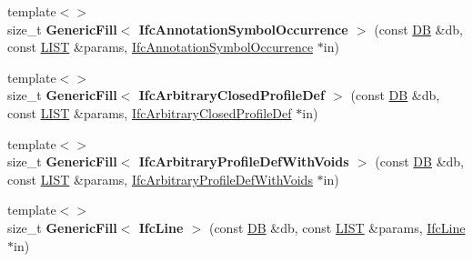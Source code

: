 \begin{DoxyCompactItemize}
\item 
\hypertarget{namespace_assimp_1_1_s_t_e_p_a406a22b40d4757a3fcf12a525b125973}{{\footnotesize template$<$$>$ }\\size\+\_\+t {\bfseries Generic\+Fill$<$ Ifc\+Annotation\+Symbol\+Occurrence $>$} (const \hyperlink{class_assimp_1_1_s_t_e_p_1_1_d_b}{D\+B} \&db, const \hyperlink{class_assimp_1_1_s_t_e_p_1_1_e_x_p_r_e_s_s_1_1_l_i_s_t}{L\+I\+S\+T} \&params, \hyperlink{struct_assimp_1_1_i_f_c_1_1_ifc_annotation_symbol_occurrence}{Ifc\+Annotation\+Symbol\+Occurrence} $\ast$in)}\label{namespace_assimp_1_1_s_t_e_p_a406a22b40d4757a3fcf12a525b125973}

\item 
\hypertarget{namespace_assimp_1_1_s_t_e_p_a25cc071d60e96c7112afe7ef971b5c62}{{\footnotesize template$<$$>$ }\\size\+\_\+t {\bfseries Generic\+Fill$<$ Ifc\+Arbitrary\+Closed\+Profile\+Def $>$} (const \hyperlink{class_assimp_1_1_s_t_e_p_1_1_d_b}{D\+B} \&db, const \hyperlink{class_assimp_1_1_s_t_e_p_1_1_e_x_p_r_e_s_s_1_1_l_i_s_t}{L\+I\+S\+T} \&params, \hyperlink{struct_assimp_1_1_i_f_c_1_1_ifc_arbitrary_closed_profile_def}{Ifc\+Arbitrary\+Closed\+Profile\+Def} $\ast$in)}\label{namespace_assimp_1_1_s_t_e_p_a25cc071d60e96c7112afe7ef971b5c62}

\item 
\hypertarget{namespace_assimp_1_1_s_t_e_p_a9e9f47e42575ec24b9fdff0db01e22f9}{{\footnotesize template$<$$>$ }\\size\+\_\+t {\bfseries Generic\+Fill$<$ Ifc\+Arbitrary\+Profile\+Def\+With\+Voids $>$} (const \hyperlink{class_assimp_1_1_s_t_e_p_1_1_d_b}{D\+B} \&db, const \hyperlink{class_assimp_1_1_s_t_e_p_1_1_e_x_p_r_e_s_s_1_1_l_i_s_t}{L\+I\+S\+T} \&params, \hyperlink{struct_assimp_1_1_i_f_c_1_1_ifc_arbitrary_profile_def_with_voids}{Ifc\+Arbitrary\+Profile\+Def\+With\+Voids} $\ast$in)}\label{namespace_assimp_1_1_s_t_e_p_a9e9f47e42575ec24b9fdff0db01e22f9}

\item 
\hypertarget{namespace_assimp_1_1_s_t_e_p_a23bf47f59ef63290e1d946ccc82d6fd7}{{\footnotesize template$<$$>$ }\\size\+\_\+t {\bfseries Generic\+Fill$<$ Ifc\+Line $>$} (const \hyperlink{class_assimp_1_1_s_t_e_p_1_1_d_b}{D\+B} \&db, const \hyperlink{class_assimp_1_1_s_t_e_p_1_1_e_x_p_r_e_s_s_1_1_l_i_s_t}{L\+I\+S\+T} \&params, \hyperlink{struct_assimp_1_1_i_f_c_1_1_ifc_line}{Ifc\+Line} $\ast$in)}\label{namespace_assimp_1_1_s_t_e_p_a23bf47f59ef63290e1d946ccc82d6fd7}


\end{DoxyCompactItemize}
